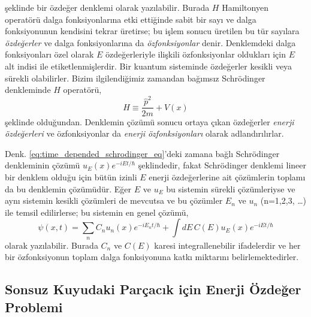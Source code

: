 \documentclass[a4paper,12pt, twoside]{article}
\begin{document}
şeklinde bir özdeğer denklemi olarak yazılabilir. Burada $H$ Hamiltonyen operatörü dalga fonksiyonlarına etki ettiğinde sabit bir sayı ve dalga fonksiyonunun kendisini tekrar üretirse; bu işlem sonucu üretilen bu tür sayılara \emph{özdeğerler} ve dalga fonksiyonlarına da \emph{özfonksiyonlar} denir. Denklemdeki dalga fonksiyonları özel olarak $E$ özdeğerleriyle ilişkili özfonksiyonlar oldukları için $E$ alt indisi ile etiketlenmişlerdir. Bir kuantum sisteminde özdeğerler kesikli veya sürekli olabilirler. Bizim ilgilendiğimiz zamandan bağımsız Schrödinger denkleminde $H$ operatörü,
\begin{equation}
H\equiv\frac{\hat p^{2}}{2 m}+V(x)
\end{equation}
şeklinde olduğundan. Denklemin çözümü sonucu ortaya çıkan özdeğerler \emph{enerji özdeğerleri} ve özfonksiyonlar da \emph{enerji özfonksiyonları} olarak adlandırılırlar.

Denk. \ref{eq:time_depended_schrodinger_eq}'deki zamana bağlı Schrödinger denkleminin çözümü $u_{E}(x) e ^ { - i E t / \hbar }$ şeklindedir, fakat Schrödinger denklemi lineer bir denklem olduğu için bütün izinli $E$ enerji özdeğerlerine ait çözümlerin toplamı da bu denklemin çözümüdür. Eğer $E$ ve $u_{E}$ bu sistemin sürekli çözümleriyse ve aynı sistemin kesikli çözümleri de mevcutsa ve bu çözümler $E_n$ ve $u_{n}$ (n=1,2,3, \ldots) ile temsil edilirlerse;
bu sistemin en genel çözümü,
\begin{equation}
\psi ( x , t ) = \sum _ { n } C _ { n } u _ { n } ( x ) e ^ { - i E _ { n } t / \hbar } + \int d E \, C ( E ) u _ { E } ( x ) e ^ { - i E t / \hbar }
\end{equation}
olarak yazılabilir. Burada $C_n$ ve $C(E)$ karesi integrallenebilir ifadelerdir ve her bir özfonksiyonun toplam dalga fonksiyonuna katkı miktarını belirlemektedirler.

\subsection{Sonsuz Kuyudaki Parçacık için Enerji Özdeğer Problemi}
\end{document}
